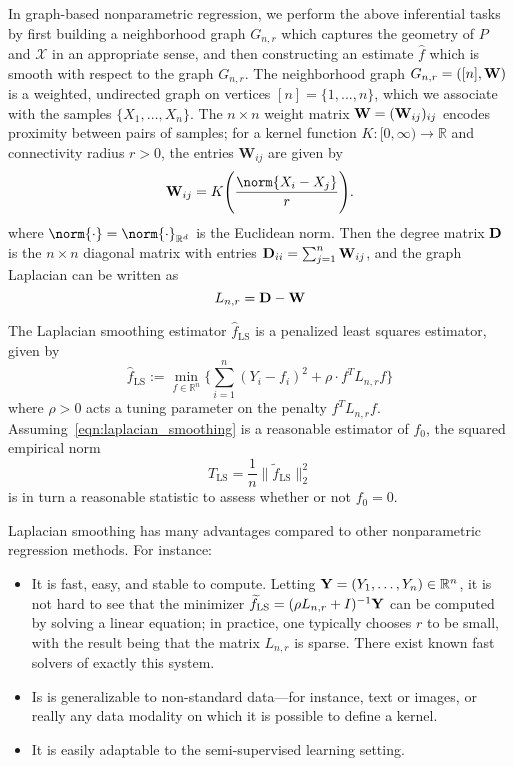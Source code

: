 \documentclass{article}
\newcommand{\Reals}{\mathbb{R}}
\newcommand{\1}{\mathbf{1}}
\newcommand{\Rd}{\Reals^d}
\newcommand{\Lap}{L}
\newcommand{\mc}[1]{\mathcal{#1}}
\newcommand{\wt}[1]{\widetilde{#1}}
\newcommand{\wh}[1]{\widehat{#1}}
\newcommand{\LS}{\mathrm{LS}}
\theoremstyle{alden}
\theoremstyle{aldenthm}
\theoremstyle{definition}
\theoremstyle{remark}
\begin{document}
In graph-based nonparametric regression, we perform the above inferential tasks by first building a neighborhood graph $G_{n,r}$ which captures the geometry of $P$ and $\mc{X}$ in an appropriate sense, and then constructing an estimate $\wh{f}$ which is smooth with respect to the graph $G_{n,r}$. The neighborhood graph $G_{n,r} = ([n],{\bf W})$ is a weighted, undirected graph on vertices $[n] = \{1,...,n\}$, which we associate with the samples $\{X_1,\ldots,X_n\}$. The $n \times n$ weight matrix ${\bf W} = ({\bf W}_{ij})_{ij}$ encodes proximity between pairs of samples; for a kernel function $K: [0,\infty) \to \Reals$ and connectivity radius $r > 0$, the entries $\mathbf{W}_{ij}$ are given by
\begin{equation*}
\label{eqn:neighborhood_graph}
{\bf W}_{ij} = K\Biggl(\frac{\norm{X_i - X_j}}{r}\Biggr).
\end{equation*}
where $\norm{\cdot} = \norm{\cdot}_{\Rd}$ is the Euclidean norm. Then the degree matrix ${\bf D}$ is the $n \times n$ diagonal matrix with entries ${\bf D}_{ii} = \sum_{j = 1}^{n}{\bf W}_{ij}$, and the graph Laplacian can be written as
\begin{equation}
\label{eqn:graph_Laplacian}
\Lap_{n,r} = \bf{D} - \bf{W}
\end{equation}

The Laplacian smoothing estimator $\wh{f}_{\LS}$ \citep{smola2003} is a penalized least squares estimator, given by
\begin{equation}
\label{eqn:laplacian_smoothing}
\wh{f}_{\LS} := \min_{f \in \Reals^n} \biggl\{\sum_{i = 1}^{n}(Y_i - f_i)^2 + \rho \cdot f^T \Lap_{n,r} f \biggr\}
\end{equation}
where $\rho > 0$ acts a tuning parameter on the penalty $f^T \Lap_{{n,r}} f$.
Assuming~\eqref{eqn:laplacian_smoothing} is a reasonable estimator of $f_0$, the squared empirical norm
\begin{equation}
T_{\LS} = \frac{1}{n}\bigl\|\wt{f}_{\LS}\bigr\|_2^2 \label{eqn:laplacian_smoothing_test}
\end{equation}
is in turn a reasonable statistic to assess whether or not $f_0 = 0$. 

Laplacian smoothing has many advantages compared to other nonparametric regression methods. For instance:
\begin{itemize}
	\item It is fast, easy, and stable to compute. Letting ${\bf Y} = (Y_1,\ldots,Y_n) \in \Reals^n$, it is not hard to see that the minimizer $\wt{f}_{\LS} = (\rho \Lap_{n,r} + I)^{-1}{\bf Y}$ can be computed by solving a linear equation; in practice, one typically chooses $r$ to be small, with the result being that the matrix $\Lap_{n,r}$ is sparse. There exist known fast solvers of exactly this system.
	\item Is is generalizable to non-standard data---for instance, text or images, or really any data modality on which it is possible to define a kernel.
	\item It is easily adaptable to the semi-supervised learning setting. 
\end{itemize}
\end{document}
